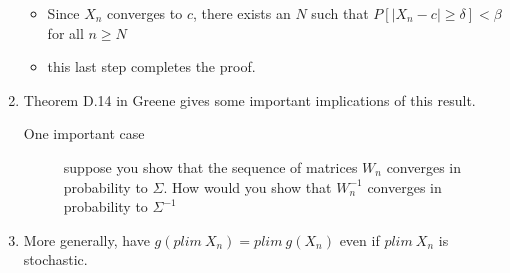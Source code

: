 \begin{enumerate}
\begin{itemize}
\begin{itemize}
\end{itemize}
\item Since $X_n$ converges to $c$, there exists an $N$
              such that $P[|X_n - c| \geq \delta] < \beta$ for
              all $n \geq N$
\item this last step completes the proof.
\end{itemize}
\item Theorem D.14 in Greene gives some important implications of
            this result.
\begin{description}
\item[One important case] suppose you show that the sequence of
                 matrices $W_n$ converges in probability to $\Sigma$.
                 How would you show that $W_n^{-1}$ converges in
                 probability to $\Sigma^{-1}$
\end{description}
\item More generally, have $g(plim\ X_n) = plim\ g(X_n)$ even if
            $plim\ X_n$ is stochastic.
\end{enumerate}

